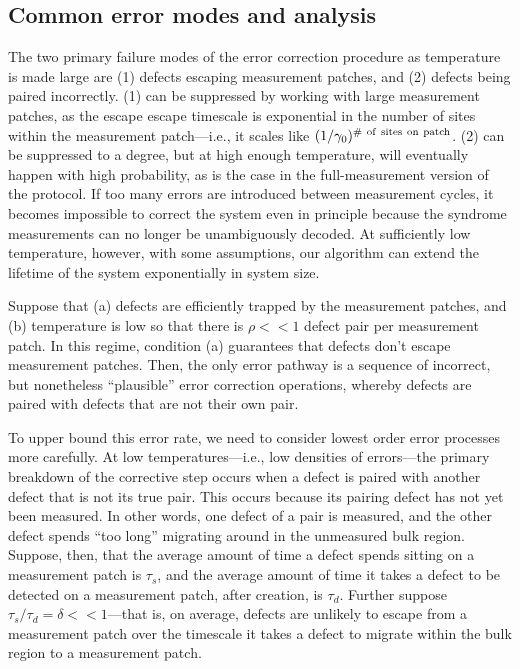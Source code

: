 \documentclass[twocolumn,superscriptaddress,aps,prb,floatfix]{revtex4-1}
\begin{document}
 
 \subsection{Common error modes and analysis}
 \label{sec:threshold}
 
 The two primary failure modes of the error correction procedure as temperature is made large are (1) defects escaping measurement patches, and (2) defects being paired incorrectly.  (1) can be suppressed by working with large measurement patches, as the escape escape timescale is exponential in the number of sites within the measurement patch---i.e., it scales like $(1/\gamma_0)^{\rm{\#\ of\ sites\ on\ patch}}$.  (2) can be suppressed to a degree, but at high enough temperature, will eventually happen with high probability, as is the case in the full-measurement version of the protocol.  If too many errors are introduced between measurement cycles, it becomes impossible to correct the system even in principle because the syndrome measurements can no longer be unambiguously decoded.  At sufficiently low temperature, however, with some assumptions, our algorithm can extend the lifetime of the system exponentially in system size.
 
 Suppose that (a) defects are efficiently trapped by the measurement patches, and (b) temperature is low so that there is $\rho<<1$ defect pair per measurement patch.  In this regime, condition (a) guarantees that defects don't escape measurement patches.  Then, the only error pathway is a sequence of incorrect, but nonetheless ``plausible'' error correction operations, whereby defects are paired with defects that are not their own pair.  
 

 To upper bound this error rate, we need to consider lowest order error processes more carefully.  At low temperatures---i.e., low densities of errors---the primary breakdown of the corrective step occurs when a defect is paired with another defect that is not its true pair.  This occurs because its pairing defect has not yet been measured.  In other words, one defect of a pair is measured, and the other defect spends ``too long'' migrating around in the unmeasured bulk region.  Suppose, then, that the average amount of time a defect spends sitting on a measurement patch is $\tau_s$, and the average amount of time it takes a defect to be detected on a measurement patch, after creation, is $\tau_d$.  Further suppose $\tau_s/\tau_d = \delta << 1$---that is, on average, defects are unlikely to escape from a measurement patch over the timescale it takes a defect to migrate within the bulk region to a measurement patch.
\end{document}
